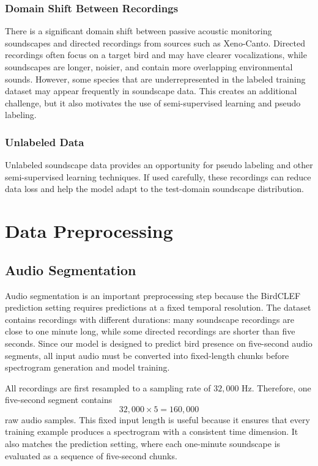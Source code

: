 \documentclass[a4paper,12pt]{article}
\begin{document}
\subsubsection{Domain Shift Between Recordings}
There is a significant domain shift between passive acoustic monitoring soundscapes and directed recordings from sources such as Xeno-Canto. Directed recordings often focus on a target bird and may have clearer vocalizations, while soundscapes are longer, noisier, and contain more overlapping environmental sounds. However, some species that are underrepresented in the labeled training dataset may appear frequently in soundscape data. This creates an additional challenge, but it also motivates the use of semi-supervised learning and pseudo labeling.

\subsubsection{Unlabeled Data}
Unlabeled soundscape data provides an opportunity for pseudo labeling and other semi-supervised learning techniques. If used carefully, these recordings can reduce data loss and help the model adapt to the test-domain soundscape distribution.

\section{Data Preprocessing}

\subsection{Audio Segmentation}

Audio segmentation is an important preprocessing step because the BirdCLEF prediction setting requires predictions at a fixed temporal resolution. The dataset contains recordings with different durations: many soundscape recordings are close to one minute long, while some directed recordings are shorter than five seconds. Since our model is designed to predict bird presence on five-second audio segments, all input audio must be converted into fixed-length chunks before spectrogram generation and model training.

All recordings are first resampled to a sampling rate of $32{,}000$ Hz. Therefore, one five-second segment contains
\[
32{,}000 \times 5 = 160{,}000
\]
raw audio samples. This fixed input length is useful because it ensures that every training example produces a spectrogram with a consistent time dimension. It also matches the prediction setting, where each one-minute soundscape is evaluated as a sequence of five-second chunks.
\end{document}
